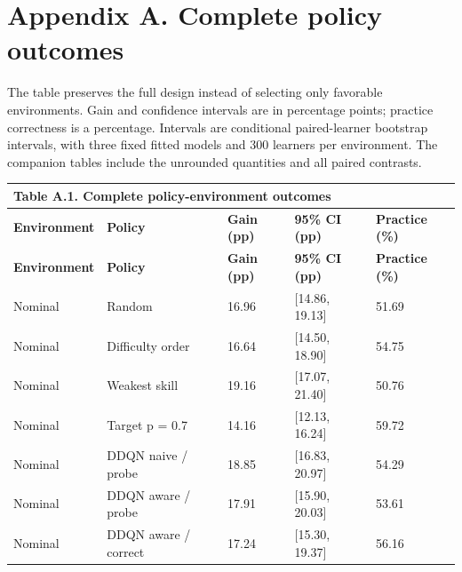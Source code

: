 \documentclass[preprint,11pt,authoryear]{elsarticle}
\begin{document}
\clearpage

\section*{Appendix A. Complete policy outcomes}

The table preserves the full design instead of selecting only favorable environments. Gain and confidence intervals are in percentage points; practice correctness is a percentage. Intervals are conditional paired-learner bootstrap intervals, with three fixed fitted models and 300 learners per environment. The companion tables include the unrounded quantities and all paired contrasts.

\begingroup\small\setlength{\tabcolsep}{3pt}

\begin{longtable}{p{}p{}p{}p{}p{}}

\multicolumn{5}{l}{\textbf{Table A.1.} Complete policy-environment outcomes}\\

\toprule

\textbf{Environment} & \textbf{Policy} & \textbf{Gain (pp)} & \textbf{95\% CI (pp)} & \textbf{Practice (\%)}\\\midrule\endfirsthead

\textbf{Environment} & \textbf{Policy} & \textbf{Gain (pp)} & \textbf{95\% CI (pp)} & \textbf{Practice (\%)}\\\midrule\endhead

\bottomrule\endfoot

Nominal & Random & 16.96 & [14.86, 19.13] & 51.69\\

Nominal & Difficulty order & 16.64 & [14.50, 18.90] & 54.75\\

Nominal & Weakest skill & 19.16 & [17.07, 21.40] & 50.76\\

Nominal & Target p = 0.7 & 14.16 & [12.13, 16.24] & 59.72\\

Nominal & DDQN naive / probe & 18.85 & [16.83, 20.97] & 54.29\\

Nominal & DDQN aware / probe & 17.91 & [15.90, 20.03] & 53.61\\

Nominal & DDQN aware / correct & 17.24 & [15.30, 19.37] & 56.16\\


\end{longtable}
\end{document}
